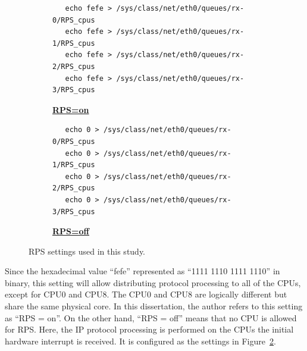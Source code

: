 \begin{figure}[h]

  \begin{subfigure}[t]{\columnwidth}
    \centering
    \begin{minipage}{0.8\columnwidth}
\begin{verbatim}
   echo fefe > /sys/class/net/eth0/queues/rx-0/RPS_cpus
   echo fefe > /sys/class/net/eth0/queues/rx-1/RPS_cpus
   echo fefe > /sys/class/net/eth0/queues/rx-2/RPS_cpus
   echo fefe > /sys/class/net/eth0/queues/rx-3/RPS_cpus
\end{verbatim}
    \end{minipage}
    \caption{\underline{\textbf{RPS=on}}}
    \label{fig:rps=on}
  \end{subfigure}

  \par\bigskip

  \begin{subfigure}[t]{\columnwidth}
    \centering
    \begin{minipage}{0.8\columnwidth}
\begin{verbatim}
   echo 0 > /sys/class/net/eth0/queues/rx-0/RPS_cpus
   echo 0 > /sys/class/net/eth0/queues/rx-1/RPS_cpus
   echo 0 > /sys/class/net/eth0/queues/rx-2/RPS_cpus
   echo 0 > /sys/class/net/eth0/queues/rx-3/RPS_cpus
\end{verbatim}
    \end{minipage}
    \caption{\underline{\textbf{RPS=off}}}
    \label{fig:rps=off}
  \end{subfigure}

  \par\bigskip
  \centering
  \begin{minipage}{0.9\columnwidth}
    \caption[RPS settings]{
      RPS settings used in this study.
    }
    \label{fig:rps_settings}
  \end{minipage}

  \par\bigskip
\end{figure}

Since the hexadecimal value \enquote{fefe} represented as \enquote{1111 1110 1111 1110} in binary, 
this setting will allow distributing protocol processing to all of the CPUs, except for CPU0 and CPU8.
The CPU0 and CPU8 are logically different but share the same physical core.
In this dissertation, the author refers to this setting as \enquote{RPS = on}.
%
On the other hand, \enquote{RPS = off} means that no CPU is allowed for RPS. 
Here, the IP protocol processing is performed on the CPUs the initial hardware interrupt is received.
It is configured as the settings in Figure~\ref{fig:rps=off}.

